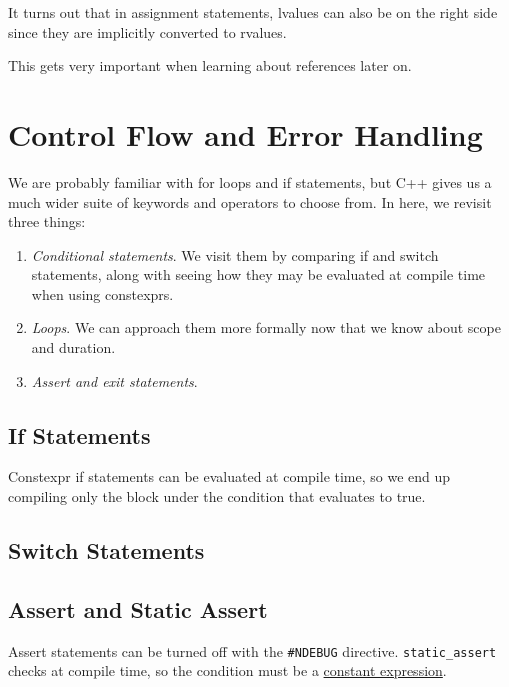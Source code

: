 \documentclass{article}
\begin{document}
    \begin{lemma}
      \label{thm:implicit-conversion-of-lvalue-to-rvalue}
      It turns out that in assignment statements, lvalues can also be on the right side since they are implicitly converted to rvalues. 
    \end{lemma}

    This gets very important when learning about references later on.

\section{Control Flow and Error Handling}  

    We are probably familiar with for loops and if statements, but C++ gives us a much wider suite of keywords and operators to choose from. In here, we revisit three things: 
    \begin{enumerate}
      \item \textit{Conditional statements}. We visit them by comparing if and switch statements, along with seeing how they may be evaluated at compile time when using constexprs. 
      \item \textit{Loops}. We can approach them more formally now that we know about scope and duration. 
      \item \textit{Assert and exit statements}. 
    \end{enumerate}

  \subsection{If Statements} 

    Constexpr if statements can be evaluated at compile time, so we end up compiling only the block under the condition that evaluates to true.   

  \subsection{Switch Statements}

  \subsection{Assert and Static Assert} 

    Assert statements can be turned off with the \texttt{\#NDEBUG} directive. \texttt{static\_assert} checks at compile time, so the condition must be a \hyperref[def:constant-expression]{constant expression}. 
\end{document}
